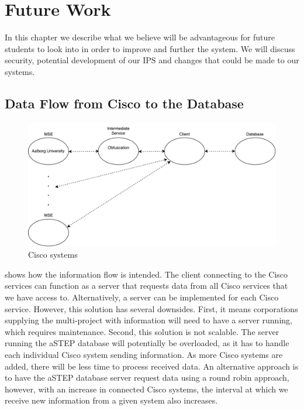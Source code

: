 \chapter{Future Work}
\label{Cha:Future_Work}
In this chapter we describe what we believe will be advantageous for future students to look into in order to improve and further the system. 
We will discuss security, potential development of our IPS and changes that could be made to our systems. 

\section{Data Flow from Cisco to the Database}\label{sec:data_flow}
\begin{figure}[ht]
	\begin{center}
		\includegraphics[scale=0.7]{graphics/ciscoNew.pdf}
		\caption{Cisco systems}
		\label{fig:cisco_systems}
	\end{center} 
\end{figure}
 shows how the information flow is intended. The client connecting to the Cisco services can function as a server that requests data from all Cisco services that we have access to. Alternatively, a server can be implemented for each Cisco service. However, this solution has several downsides. First, it means corporations supplying the multi-project with information will need to have a server running, which requires maintenance. Second, this solution is not scalable. The server running the aSTEP database will potentially be overloaded, as it has to handle each individual Cisco system sending information. As more Cisco systems are added, there will be less time to process received data. An alternative approach is to have the aSTEP database server request data using a round robin approach, however, with an increase in connected Cisco systems, the interval at which we receive new information from a given system also increases.

